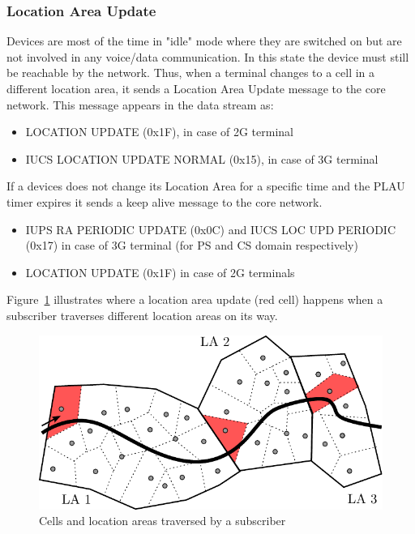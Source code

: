 \documentclass[master,english]{hgbthesis}
\begin{document}
\subsubsection{Location Area Update}
Devices are most of the time in "idle" mode where they are switched on but are not involved in any voice/data communication. In this state the device must still be reachable by the network. Thus, when a terminal changes to a cell in a different location area, it sends a Location Area Update message to the core network.
This message appears in the data stream as:
\begin{itemize}
	\item LOCATION UPDATE (0x1F), in case of 2G terminal
	\item IUCS LOCATION UPDATE NORMAL (0x15), in case of 3G terminal
\end{itemize}
If a devices does not change its Location Area for a specific time and the PLAU timer expires it sends a keep alive message to the core network.
\begin{itemize}
	\item IUPS RA PERIODIC UPDATE (0x0C) and IUCS LOC UPD PERIODIC
	      (0x17) in case of 3G terminal (for PS and CS domain respectively)
	\item LOCATION UPDATE (0x1F) in case of 2G terminals
\end{itemize}
Figure~\ref{fig:latraversed} illustrates where a location area update (red cell) happens when a subscriber traverses different location areas on its way.
%
\begin{figure}
	\centering
	\includegraphics[width=\linewidth]{./images/laupdate.pdf}
	\caption{Cells and location areas traversed by a subscriber}
	\label{fig:latraversed}
\end{figure}
\end{document}
